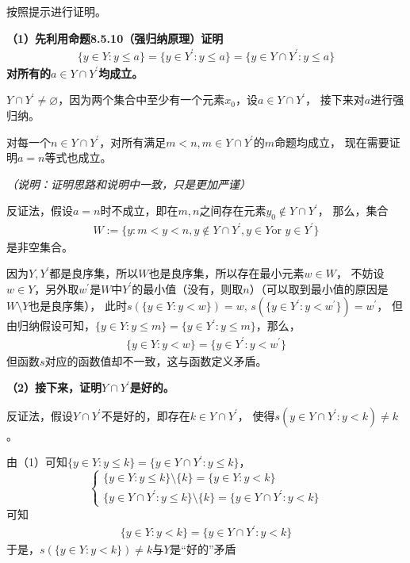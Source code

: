 \documentclass{article}
\begin{document}
按照提示进行证明。

\textbf{（1）先利用命题8.5.10（强归纳原理）证明
  \begin{align*}
    \{y \in Y: y \leq a \} = \{y \in Y^\prime: y \leq a \} = \{y \in Y \cap Y^\prime: y \leq a \}
  \end{align*}
  对所有的$a \in Y \cap Y^\prime$均成立。}

$Y \cap Y^\prime \neq \varnothing$，因为两个集合中至少有一个元素$x_0$，设$a \in Y \cap Y^\prime$，
接下来对$a$进行强归纳。

对每一个$n \in Y \cap Y^\prime$，对所有满足$m < n, m \in Y \cap Y^\prime$的$m$命题均成立，
现在需要证明$a=n$等式也成立。

\textit{（说明：证明思路和说明中一致，只是更加严谨）}

反证法，假设$a=n$时不成立，即在$m, n$之间存在元素$y_0 \not \in Y \cap Y^\prime$， 那么，集合
\begin{align*}
  W := \{ y: m < y <n, y \not \in Y \cap Y^\prime, y \in Y \text{or } y \in Y^\prime \}
\end{align*}
是非空集合。

因为$Y,Y^\prime$都是良序集，所以$W$也是良序集，所以存在最小元素$w \in W$，
不妨设$w \in Y$，另外取$w^\prime$是$W$中$Y^\prime$的最小值（没有，则取$n$）（可以取到最小值的原因是$W \setminus Y$也是良序集），
此时$s(\{ y \in Y: y < w \}) = w$, $s(\{ y \in Y^\prime: y < w^\prime \}) = w^\prime$，
但由归纳假设可知，$\{y \in Y: y \leq m \} = \{y \in Y^\prime: y \leq m \}$，那么，
\begin{align*}
  \{ y \in Y: y < w \} = \{ y \in Y^\prime: y < w^\prime \}
\end{align*}
但函数$s$对应的函数值却不一致，这与函数定义矛盾。


\textbf{（2）接下来，证明$Y \cap Y^\prime$是好的。}

反证法，假设$Y \cap Y^\prime$不是好的，即存在$k \in Y \cap Y^\prime$，
使得$s({y \in Y \cap Y^\prime : y < k }) \neq k$。

由（1）可知$\{y \in Y : y \leq k \} = \{y \in Y \cap Y^\prime : y \leq k \}$，
\begin{equation*}
  \begin{cases*}
    \{y \in Y : y \leq k \} \setminus \{k\}                = \{y \in Y : y < k \} \\
    \{y \in Y \cap Y^\prime : y \leq k \} \setminus \{k\}  = \{y \in Y \cap Y^\prime : y < k \}
  \end{cases*}
\end{equation*}
可知
\begin{align*}
  \{y \in Y : y < k \} = \{y \in Y \cap Y^\prime : y < k \}
\end{align*}
于是，$s(\{y \in Y : y < k \}) \neq k$与$Y$是“好的”矛盾
\end{document}
